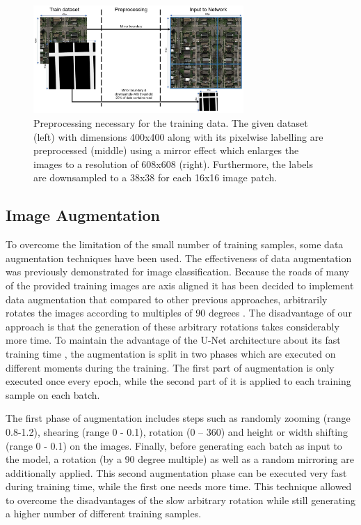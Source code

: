 \documentclass[10pt,conference,compsocconf]{IEEEtran}
\begin{document}
\begin{figure}
\includegraphics[width={8cm}]{preprocessing}
\caption{Preprocessing necessary for the training data. The given dataset (left) with dimensions 400x400 along with its pixelwise labelling are preprocessed (middle) using a mirror effect which enlarges the images to a resolution of 608x608 (right). Furthermore, the labels are downsampled to a 38x38 for each 16x16 image patch.}
\label{fig:preprocessing}
\end{figure}

\subsection{Image Augmentation}

To overcome the limitation of the small number of training samples, some data augmentation techniques have been used. The effectiveness of data augmentation was previously demonstrated \cite{Wang} for image classification. Because the roads of many of the provided training images are axis aligned it has been decided to implement data augmentation that compared to other previous approaches, arbitrarily rotates the images according to multiples of 90 degrees \cite{Pavllo2017}. The disadvantage of our approach is that the generation of these arbitrary rotations takes considerably more time. To maintain the advantage of the U-Net architecture about its fast training time \cite{Ronneberger2015}, the augmentation is split in two phases which are executed on different moments during the training. The first part of augmentation is only executed once every epoch, while the second part of it is applied to each training sample on each batch.

The first phase of augmentation includes steps such as randomly zooming (range 0.8-1.2), shearing (range 0 - 0.1), rotation (0 – 360) and height or width shifting (range 0 - 0.1) on the images. Finally, before generating each batch as input to the model, a rotation (by a 90 degree multiple) as well as a random mirroring are additionally applied. This second augmentation phase can be executed very fast during training time, while the first one needs more time. This technique allowed to overcome the disadvantages of the slow arbitrary rotation while still generating a higher number of different training samples.
\end{document}
